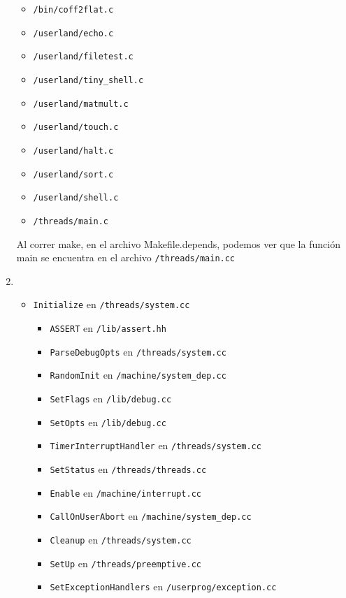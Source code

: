 \documentclass[11pt]{article}
\begin{document}
\begin{enumerate}
\begin{itemize}
        \item \texttt{/bin/coff2flat.c}
        \item \texttt{/userland/echo.c}
        \item \texttt{/userland/filetest.c}
        \item \texttt{/userland/tiny\_shell.c}
        \item \texttt{/userland/matmult.c}
        \item \texttt{/userland/touch.c}
        \item \texttt{/userland/halt.c}
        \item \texttt{/userland/sort.c}
        \item \texttt{/userland/shell.c}
        \item \texttt{/threads/main.c}
    \end{itemize}
    Al correr make, en el archivo Makefile.depends, podemos ver que la función
    main se encuentra en el archivo \texttt{/threads/main.cc}
    \item
    \begin{itemize}
    \item \texttt{Initialize} en \texttt{/threads/system.cc}
        \begin{itemize}
            \item \texttt{ASSERT} en \texttt{/lib/assert.hh}
            \item \texttt{ParseDebugOpts} en \texttt{/threads/system.cc}
            \item \texttt{RandomInit} en \texttt{/machine/system\_dep.cc}
            \item \texttt{SetFlags} en \texttt{/lib/debug.cc}
            \item \texttt{SetOpts} en \texttt{/lib/debug.cc}
            \item \texttt{TimerInterruptHandler} en \texttt{/threads/system.cc}
            \item \texttt{SetStatus} en \texttt{/threads/threads.cc}
            \item \texttt{Enable} en \texttt{/machine/interrupt.cc}
            \item \texttt{CallOnUserAbort} en \texttt{/machine/system\_dep.cc}
            \item \texttt{Cleanup} en \texttt{/threads/system.cc}
            \item \texttt{SetUp} en \texttt{/threads/preemptive.cc}
            \item \texttt{SetExceptionHandlers} en \texttt{/userprog/exception.cc}

\end{itemize}
\end{itemize}
\end{enumerate}
\end{document}
